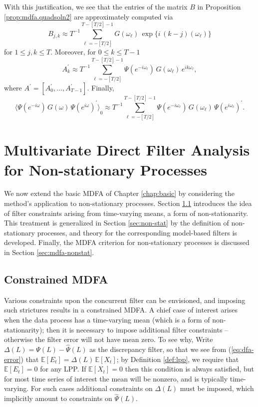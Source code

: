 \documentclass[a4paper]{book}
\def\EE{\mathbb E}
\begin{document}
With this justification, we see that the entries of the matrix $B$ in 
 Proposition \ref{prop:mdfa.quadsoln2} are approximately computed via
\[
  B_{j,k} \approx T^{-1} \sum_{\ell=-[T/2]}^{T-[T/2]-1} G (\omega_{\ell}) \,
   \exp \{ i \, (k-j) (\omega_{\ell}) \}
\]
 for $1 \leq j,k \leq T$.  Moreover, for $0 \leq k \leq T-1$
\[
  A_k^{\prime} \approx T^{-1}  \sum_{\ell=-[T/2]}^{T-[T/2]-1} \Psi 
	( e^{ -i \omega_{\ell} }) \,     G (\omega_{\ell}) \,
   e^{ i  k \omega_{\ell} },
\]
 where $A^{\prime} = [ A_0^{\prime}, \ldots, A_{T-1}^{\prime} ]$.  Finally,
\[
  { \langle \Psi (e^{-i \omega}) \, G (\omega)  \, { \Psi (e^{i \omega}) }^{\prime} \rangle }_0 \approx
  T^{-1}  \sum_{\ell=-[T/2]}^{T-[T/2]-1}  \Psi 
	( e^{ -i  \omega_{\ell} } ) \,
     G (\omega_{\ell}) \,  {\Psi  ( e^{ i \omega_{\ell} } ) }^{\prime}.
\]
 
 



\chapter{Multivariate Direct Filter Analysis for Non-stationary Processes}
\label{chap:int}

 We now extend the basic MDFA of Chapter \ref{chap:basic}  by considering
 the method's application to  non-stationary processes.  
 Section \ref{sec:constraint} introduces the idea of filter constraints
arising from time-varying means, a form of non-stationarity.
 This treatment is generalized in Section \ref{sec:non-stat}
  by the definition of non-stationary processes, and theory for the corresponding
   model-based filters is developed.  Finally, the MDFA criterion for
    non-stationary processes is discussed in Section \ref{sec:mdfa-nonstat}.
 

\section{Constrained MDFA}
\label{sec:constraint}

 Various constraints upon the concurrent filter can be envisioned, 
   and imposing such strictures results in  a constrained MDFA. 
   A chief case of interest arises when the 
    data process has a time-varying mean (which is a form of  non-stationarity);
  then it is necessary to impose additional filter constraints -- otherwise
   the filter error will not have mean zero.    To see why, 
   Write $\Delta (L) = \Psi (L) - \widehat{\Psi} (L)$ as the discrepancy filter,
   so that we see  from (\ref{eq:dfa-error})  
   that $\EE [ E_t ] = \Delta (L) \, \EE [ X_t ]$; 
   by Definition \ref{def:lpp}, we require
 that $\EE [ E_t ] = 0$ for any LPP.  
  If $\EE [ X_t] = 0$ then this condition is always satisfied, but
   for most time series of interest the mean will be nonzero, and is typically
    time-varying.  For such cases additional constraints on $\Delta (L)$ must be imposed,
    which implicitly amount to constraints on $\widehat{\Psi} (L)$.
    
\end{document}
